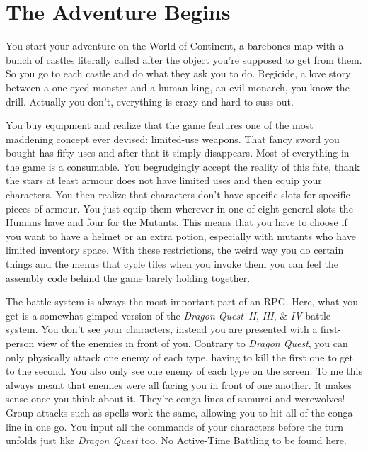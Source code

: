\documentclass{book}
\begin{document}
\FloatBarrier\needspace{10mm}\section*{The Adventure Begins}\nopagebreak[4]

You start your adventure on the World of Continent, a barebones map with a bunch of castles literally called after the object you’re supposed to get from them. So you go to each castle and do what they ask you to do. Regicide, a love story between a one-eyed monster and a human king, an evil monarch, you know the drill. Actually you don’t, everything is crazy and hard to suss out.

You buy equipment and realize that the game features one of the most maddening concept ever devised: limited-use weapons. That fancy sword you bought has fifty uses and after that it simply disappears. Most of everything in the game is a consumable. You begrudgingly accept the reality of this fate, thank the stars at least armour does not have limited uses and then equip your characters. You then realize that characters don’t have specific slots for specific pieces of armour. You just equip them wherever in one of eight general slots the Humans have and four for the Mutants. This means that you have to choose if you want to have a helmet or an extra potion, especially with mutants who have limited inventory space. With these restrictions, the weird way you do certain things and the menus that cycle tiles when you invoke them you can feel the assembly code behind the game barely holding together.

The battle system is always the most important part of an RPG. Here, what you get is a somewhat gimped version of the \emph{Dragon Quest~II}, \emph{III}, \& \emph{IV} battle system. You don’t see your characters, instead you are presented with a first-person view of the enemies in front of you. Contrary to \emph{Dragon Quest}, you can only physically attack one enemy of each type, having to kill the first one to get to the second. You also only see one enemy of each type on the screen. To me this always meant that enemies were all facing you in front of one another. It makes sense once you think about it. They’re conga lines of samurai and werewolves! Group attacks such as spells work the same, allowing you to hit all of the conga line in one go. You input all the commands of your characters before the turn unfolds just like \emph{Dragon Quest} too. No Active-Time Battling to be found here.
\end{document}
